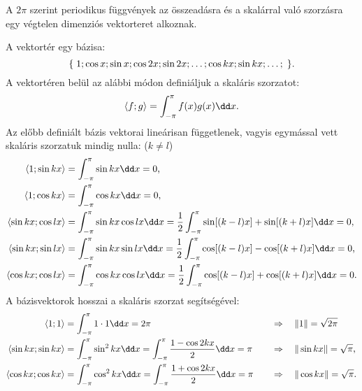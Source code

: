 \documentclass[a4paper, 12pt]{scrartcl}
\begin{document}
\begin{blueBox}

  A $2\pi$ szerint periodikus függvények az összeadásra és a skalárral való
  szorzásra egy végtelen dimenziós vektorteret alkoznak.

  A vektortér egy bázisa:
  $$
    \{\;
    1;
    \cos x; \sin x;
    \cos 2x; \sin 2x;
    \dots;
    \cos kx; \sin kx;
    \dots;
    \;\}
    \text.
  $$
  A vektortéren belül az alábbi módon definiáljuk a skaláris szorzatot:
  $$
    \langle f; g \rangle
    = \int_{-\pi}^{\pi} f(x) g(x) \dd x
    \text.
  $$
  Az előbb definiált bázis vektorai lineárisan függetlenek, vagyis egymással
  vett skaláris szorzatuk mindig nulla: ($k \neq l$)
  \begin{align*}
    \langle 1; \sin kx \rangle
     & = \int_{-\pi}^{\pi} \sin kx \dd x = 0
    \text,
    \\
    \langle 1; \cos kx \rangle
     & = \int_{-\pi}^{\pi} \cos kx \dd x = 0
    \text,
    \\
    \langle \sin kx; \cos lx \rangle
     & = \int_{-\pi}^{\pi} \sin kx \cos lx \dd x
    = \frac{1}{2} \int_{-\pi}^{\pi} \sin[(k-l)x] + \sin[(k+l)x] \dd x
    = 0
    \text,
    \\
    \langle \sin kx; \sin lx \rangle
     & = \int_{-\pi}^{\pi} \sin kx \sin lx \dd x
    = \frac{1}{2} \int_{-\pi}^{\pi} \cos[(k-l)x] - \cos[(k+l)x] \dd x
    = 0
    \text,
    \\
    \langle \cos kx; \cos lx \rangle
     & = \int_{-\pi}^{\pi} \cos kx \cos lx \dd x
    = \frac{1}{2} \int_{-\pi}^{\pi} \cos[(k-l)x] + \cos[(k+l)x] \dd x
    = 0
    \text.
  \end{align*}
  A bázisvektorok hosszai a skaláris szorzat segítségével:
  \begin{alignat*}{9}
    \langle 1; 1 \rangle
     & = \int_{-\pi}^{\pi} 1 \cdot 1 \dd x = 2\pi
     &
     & \quad \Rightarrow \quad
    \|1\| = \sqrt{2\pi}
    \\
    \langle \sin kx; \sin kx \rangle
     & = \int_{-\pi}^{\pi} \sin^2 kx \dd x =
    \int_{-\pi}^{\pi} \frac{1 - \cos 2kx}{2} \dd x
    = \pi
     &
     & \quad \Rightarrow \quad
    \|\sin kx\| = \sqrt{\pi}
    \text,
    \\
    \langle \cos kx; \cos kx \rangle
     & = \int_{-\pi}^{\pi} \cos^2 kx \dd x =
    \int_{-\pi}^{\pi} \frac{1 + \cos 2kx}{2} \dd x
    = \pi
     &
     & \quad \Rightarrow \quad
    \|\cos kx\| = \sqrt{\pi}
    \text.
  \end{alignat*}

\end{blueBox}
\end{document}
